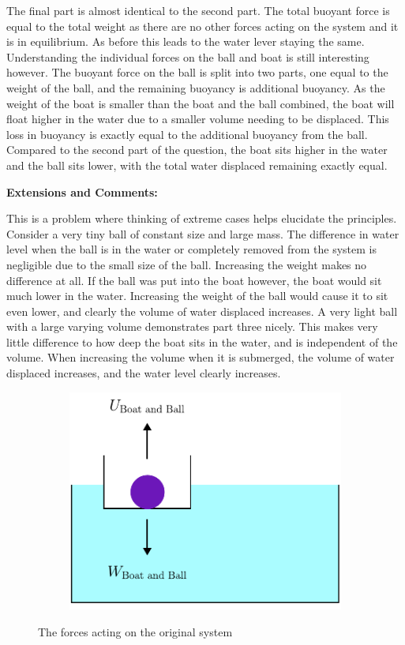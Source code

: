 The final part is almost identical to the second part. The total buoyant force is equal to the total weight as there are no other forces acting on the system and it is in equilibrium. As before this leads to the water lever staying the same. Understanding the individual forces on the ball and boat is still interesting however. The buoyant force on the ball is split into two parts, one equal to the weight of the ball, and the remaining buoyancy is additional buoyancy. As the weight of the boat is smaller than the boat and the ball combined, the boat will float higher in the water due to a smaller volume needing to be displaced. This loss in buoyancy is exactly equal to the additional buoyancy from the ball. Compared to the second part of the question, the boat sits higher in the water and the ball sits lower, with the total water displaced remaining exactly equal.

\textbf{Extensions and Comments:}

This is a problem where thinking of extreme cases helps elucidate the principles. Consider a very tiny ball of constant size and large mass. The difference in water level when the ball is in the water or completely removed from the system is negligible due to the small size of the ball. Increasing the weight makes no difference at all. If the ball was put into the boat however, the boat would sit much lower in the water. Increasing the weight of the ball would cause it to sit even lower, and clearly the volume of water displaced increases. A very light ball with a large varying volume demonstrates part three nicely. This makes very little difference to how deep the boat sits in the water, and is independent of the volume. When increasing the volume when it is submerged, the volume of water displaced increases, and the water level clearly increases.

\begin{figure}[H]
    \centering
    \begin{subfigure}{0.49\textwidth}
        \includegraphics[width=\textwidth]{5 - Physics/TheBallAndTheBoat_Setup.pdf}
    \end{subfigure}
    \caption{The forces acting on the original system}
    \label{fig:TheBallAndTheBoat_Setup}
\end{figure}

